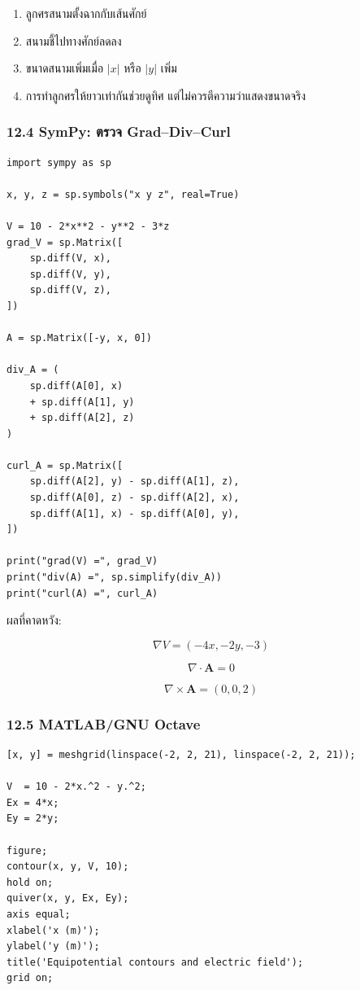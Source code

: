 \begin{enumerate}
\item ลูกศรสนามตั้งฉากกับเส้นศักย์
\item สนามชี้ไปทางศักย์ลดลง
\item ขนาดสนามเพิ่มเมื่อ \(|x|\) หรือ \(|y|\) เพิ่ม
\item การทำลูกศรให้ยาวเท่ากันช่วยดูทิศ แต่ไม่ควรตีความว่าแสดงขนาดจริง
\end{enumerate}

\subsubsection{12.4 SymPy: ตรวจ Grad--Div--Curl}

\begin{verbatim}
import sympy as sp

x, y, z = sp.symbols("x y z", real=True)

V = 10 - 2*x**2 - y**2 - 3*z
grad_V = sp.Matrix([
    sp.diff(V, x),
    sp.diff(V, y),
    sp.diff(V, z),
])

A = sp.Matrix([-y, x, 0])

div_A = (
    sp.diff(A[0], x)
    + sp.diff(A[1], y)
    + sp.diff(A[2], z)
)

curl_A = sp.Matrix([
    sp.diff(A[2], y) - sp.diff(A[1], z),
    sp.diff(A[0], z) - sp.diff(A[2], x),
    sp.diff(A[1], x) - sp.diff(A[0], y),
])

print("grad(V) =", grad_V)
print("div(A) =", sp.simplify(div_A))
print("curl(A) =", curl_A)
\end{verbatim}

ผลที่คาดหวัง:

\[
\nabla V=(-4x,-2y,-3)
\]

\[
\nabla\cdot\mathbf{A}=0
\]

\[
\nabla\times\mathbf{A}=(0,0,2)
\]

\subsubsection{12.5 MATLAB/GNU Octave}

\begin{verbatim}
[x, y] = meshgrid(linspace(-2, 2, 21), linspace(-2, 2, 21));

V  = 10 - 2*x.^2 - y.^2;
Ex = 4*x;
Ey = 2*y;

figure;
contour(x, y, V, 10);
hold on;
quiver(x, y, Ex, Ey);
axis equal;
xlabel('x (m)');
ylabel('y (m)');
title('Equipotential contours and electric field');
grid on;
\end{verbatim}

